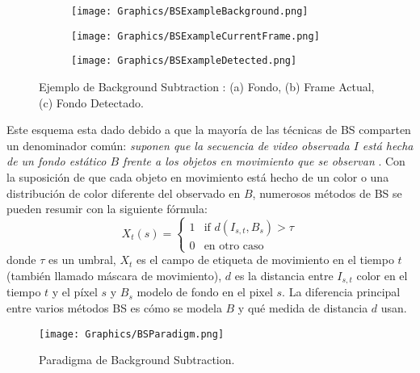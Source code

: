 \begin{figure}[h!]
	\centering
	\begin{subfigure}[b]{0.32\linewidth}
		\centering
		\texttt{[image: Graphics/BSExampleBackground.png]}
		\caption{}
	\end{subfigure}
	\begin{subfigure}[b]{0.32\linewidth}
		\centering
		\texttt{[image: Graphics/BSExampleCurrentFrame.png]}
		\caption{}
	\end{subfigure}
	\begin{subfigure}[b]{0.32\linewidth}
		\centering
		\texttt{[image: Graphics/BSExampleDetected.png]}
		\caption{}
	\end{subfigure}
	\caption{Ejemplo de Background Subtraction : (a) Fondo, (b) Frame Actual, (c) Fondo Detectado.}
	\label{fig:BSExample}
\end{figure}

Este esquema esta dado debido a que la mayoría de las técnicas de BS comparten un denominador común: \textit{suponen que la secuencia de video observada $I$ está hecha de un fondo estático $B$ frente a los objetos en movimiento que se observan} \cite{YannickPierreMarcBrunoHeleneChristophe}. Con la suposición de que cada objeto en movimiento está hecho de un color o una distribución de color diferente del observado en $B$, numerosos métodos de BS se pueden resumir con la siguiente fórmula:
\begin{equation}
X_t(s) = \left\{
\begin{array}{ll}
	1 & \mbox{if } d(I_{s,t}, B_s) > \tau \\
	0               & \mbox{en otro caso}        
\end{array}
\right.
\label{eq:BSFormula}
\end{equation}
donde $\tau$ es un umbral, $X_t$ es el campo de etiqueta de movimiento en el tiempo $t$ (también llamado máscara de movimiento), $d$ es la distancia entre $I_{s,t}$ color en el tiempo $t$ y el píxel $s$ y $B_s$ modelo de fondo en el pixel $s$. La diferencia principal entre varios métodos BS es cómo se modela $B$ y qué medida de distancia $d$ usan.\\

\begin{figure}[h!]
	\centering
	\texttt{[image: Graphics/BSParadigm.png]}
	\caption{Paradigma de Background Subtraction.}
	\label{fig:BSParadigm}
\end{figure}

